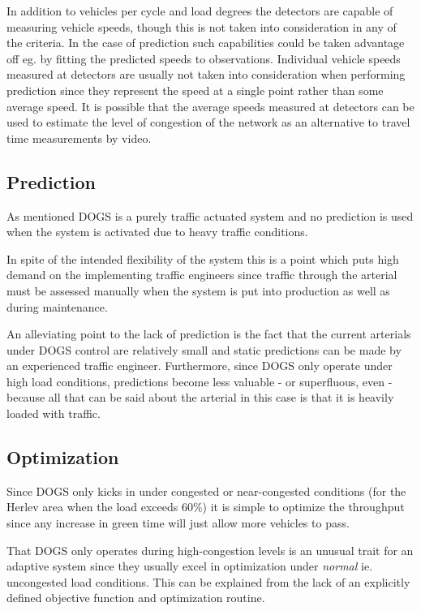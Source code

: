 In addition to vehicles per cycle and load degrees the detectors are capable of measuring vehicle speeds, though this is not taken into consideration in any of the criteria. In the case of prediction such capabilities could be taken advantage off eg. by fitting the predicted speeds to observations.
Individual vehicle speeds measured at detectors are usually not taken into consideration when performing prediction since they represent the speed at a single point rather than some average speed. It is possible that the average speeds measured at detectors can be used to estimate the level of congestion of the network as an alternative to travel time measurements by video.

\subsection{Prediction}
As mentioned DOGS is a purely traffic actuated system and no prediction is used when the system is activated due to heavy traffic conditions.

In spite of the intended flexibility of the system this is a point which puts high demand on the implementing traffic engineers since traffic through the arterial must be assessed manually when the system is put into production as well as during maintenance.

An alleviating point to the lack of prediction is the fact that the current arterials under DOGS control are relatively small and static predictions can be made by an experienced traffic engineer. Furthermore, since DOGS only operate under high load conditions, predictions become less valuable - or superfluous, even - because all that can be said about the arterial in this case is that it is heavily loaded with traffic.

\subsection{Optimization}
Since DOGS only kicks in under congested or near-congested conditions (for the Herlev area when the load exceeds 60\%) it is simple to optimize the throughput since any increase in green time will just allow more vehicles to pass.

That DOGS only operates during high-congestion levels is an unusual trait for an adaptive system since they usually excel in optimization under \textit{normal} ie. uncongested load conditions. This can be explained from the lack of an explicitly defined objective function and optimization routine.

